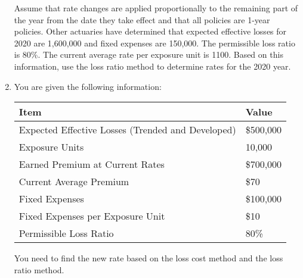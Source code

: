 \documentclass{article}
\begin{document}
\begin{enumerate}
Assume that rate changes are applied proportionally to the remaining part of the year from the date they take effect and that all policies are 1-year policies. Other actuaries have determined that expected effective losses for 2020 are 1,600,000 and fixed expenses are 150,000. The permissible loss ratio is 80\%. The current average rate per exposure unit is 1100. Based on this information, use the loss ratio method to determine rates for the 2020 year. 

\item 
You are given the following information:

\begin{table}[htbp]
\centering
\begin{tabular}{@{}ll@{}}
\toprule
\textbf{Item}                          & \textbf{Value}              \\ \midrule
Expected Effective Losses (Trended and Developed)    & \$500,000                   \\
Exposure Units                         & 10,000                      \\
Earned Premium at Current Rates        & \$700,000                   \\
Current Average Premium                & \$70                        \\
Fixed Expenses                         & \$100,000                   \\
Fixed Expenses per Exposure Unit       & \$10                        \\
Permissible Loss Ratio                 & 80\%                        \\ \bottomrule
\end{tabular}
\end{table}

You need to find the new rate based on the loss cost method and the loss ratio method.




   
   \end{enumerate}
\end{document}
